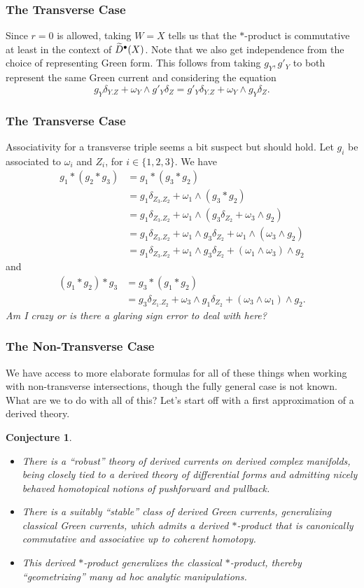 \documentclass[11pt]{beamer}
\newtheorem{conjecture}{Conjecture}
\begin{document}
\begin{frame}
\frametitle{The Transverse Case}
Since $r=0$ is allowed, taking $W=X$ tells us that the $*$-product is commutative at least in the context of $\widetilde{D}^{\bullet}(X)$. Note that we also get independence from the choice of representing Green form. This follows from taking $g_Y,g'_Y$ to both represent the same Green current and considering the equation
$$g_Y\delta_{Y.Z}+\omega_Y\wedge g'_Y\delta_Z=g'_Y\delta_{Y.Z}+\omega_Y\wedge g_Y\delta_Z.$$
\end{frame}

\begin{frame}
\frametitle{The Transverse Case}
Associativity for a transverse triple seems a bit suspect but should hold. Let $g_i$ be associated to $\omega_i$ and $Z_i$, for $i\in\{1,2,3\}$. We have 
\begin{align*}
g_1*(g_2*g_3)
&=g_1*(g_3*g_2) \\
&=g_1\delta_{Z_3.Z_2}+\omega_1\wedge(g_3*g_2) \\
&=g_1\delta_{Z_3.Z_2}+\omega_1\wedge(g_3\delta_{Z_2}+\omega_3\wedge g_2) \\
&=g_1\delta_{Z_3.Z_2}+\omega_1\wedge g_3\delta_{Z_2}+\omega_1\wedge(\omega_3\wedge g_2) \\
&=g_1\delta_{Z_3.Z_2}+\omega_1\wedge g_3\delta_{Z_2}+(\omega_1\wedge\omega_3)\wedge g_2
\end{align*}
and
\begin{align*}
(g_1*g_2)*g_3
&=g_3*(g_1*g_2) \\
&=g_3\delta_{Z_1.Z_2}+\omega_3\wedge g_1\delta_{Z_2}+(\omega_3\wedge\omega_1)\wedge g_2.
\end{align*}
\emph{Am I crazy or is there a glaring sign error to deal with here?}
\end{frame}

\begin{frame}
\frametitle{The Non-Transverse Case}
We have access to more elaborate formulas for all of these things when working with non-transverse intersections, though the fully general case is not known. What are we to do with all of this? Let's start off with a first approximation of a derived theory.

\begin{conjecture}
\begin{itemize}
\item There is a ``robust'' theory of derived currents on derived complex manifolds, being closely tied to a derived theory of differential forms and admitting nicely behaved homotopical notions of pushforward and pullback.

\item There is a suitably ``stable'' class of derived Green currents, generalizing classical Green currents, which admits a derived $*$-product that is canonically commutative and associative up to coherent homotopy.

\item This derived $*$-product generalizes the classical $*$-product, thereby ``geometrizing'' many ad hoc analytic manipulations.
\end{itemize}
\end{conjecture}
\end{frame}
\end{document}
